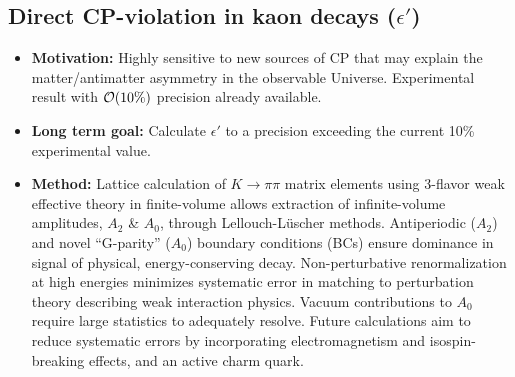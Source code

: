 \documentclass[12pt,hyperpdf]{article}
\begin{document}
\subsection{Direct CP-violation in kaon decays ($\epsilon'$)}
\begin{itemize}
    \item{\bf Motivation:} Highly sensitive to new sources of CP that may explain the matter/antimatter asymmetry in the observable Universe. Experimental result with ${\cal O}(10\%)$ precision already available.
    \item{\bf Long term goal:} Calculate $\epsilon'$ to a precision exceeding the current 10\% experimental value.        
    \item{\bf Method:} Lattice calculation of $K\to\pi\pi$ matrix elements using 3-flavor weak effective theory in finite-volume allows extraction of infinite-volume amplitudes, $A_2$ \& $A_0$, through Lellouch-L\"uscher methods. Antiperiodic ($A_2$) and novel ``G-parity'' ($A_0$) boundary conditions (BCs) ensure dominance in signal of physical, energy-conserving decay. Non-perturbative renormalization at high energies minimizes systematic error in matching to perturbation theory describing weak interaction physics. Vacuum contributions to $A_0$ require large statistics to adequately resolve. Future calculations aim to reduce systematic errors by incorporating electromagnetism and isospin-breaking effects, and an active charm quark.


\end{itemize}
\end{document}
